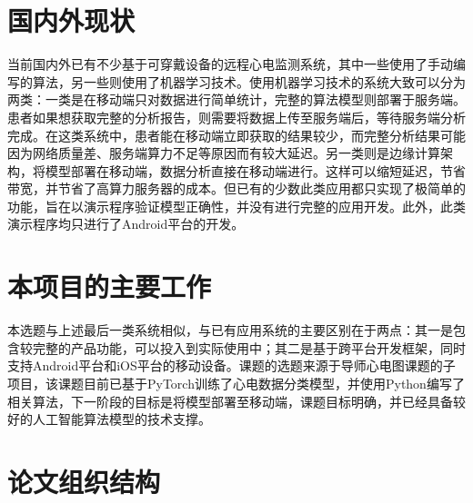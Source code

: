 \documentclass{ecnuthesis}
\begin{document}
    \section{国内外\app 现状}\label{sec:status}
    当前国内外已有不少基于可穿戴设备的远程心电监测系统，其中一些使用了手动编写的算法\cite{zhengJiyukechuandaishebeideyidongjianhuAPP2019,wuYidongxindianjiancexitongdeyanjiuyushixian2018,chenYidongxindianxinxijianhuxitongjixindianjiancesuanfadeyanjiu2018,heJiyuyidongpingtaidexindianjianceyiliaoxitongdeshixian2017,gradlRealtimeECGMonitoring2012,wenRealtimeECGTelemonitoring2008}，另一些则使用了机器学习技术。使用机器学习技术的系统大致可以分为两类：一类是在移动端只对数据进行简单统计，完整的算法模型则部署于服务端\cite{wangJiyushenduxuexideyidongyuanchengxindianjiancexitongshejiyushixian2020,singhSmartECGMonitoring2022}。患者如果想获取完整的分析报告，则需要将数据上传至服务端后，等待服务端分析完成。在这类系统中，患者能在移动端立即获取的结果较少，而完整分析结果可能因为网络质量差、服务端算力不足等原因而有较大延迟。另一类则是边缘计算架构，将模型部署在移动端，数据分析直接在移动端进行\cite{chenJiyushenduxuexidexindianfenximoxingdeshejiyuyouhua2021,liuJiyuyidongzhongduanfenxidekechuandairouxingxindianjiancexitong2021,wangEnablingSmartPersonalized2014,jinPredictingCardiovascularDisease2009}。这样可以缩短延迟，节省带宽，并节省了高算力服务器的成本。但已有的少数此类应用都只实现了极简单的功能，旨在以演示程序验证模型正确性，并没有进行完整的应用开发。此外，此类演示程序均只进行了Android平台的开发。


    \section{本项目的主要工作}\label{sec:work}
    本选题与上述最后一类系统相似，与已有应用系统的主要区别在于两点：其一是包含较完整的产品功能，可以投入到实际使用中；其二是基于跨平台开发框架，同时支持Android平台和iOS平台的移动设备。课题的选题来源于导师心电图课题的子项目，该课题目前已基于PyTorch训练了心电数据分类模型，并使用Python编写了相关算法，下一阶段的目标是将模型部署至移动端，课题目标明确，并已经具备较好的人工智能算法模型的技术支撑。


    \section{论文组织结构}\label{sec:structure}
\end{document}
